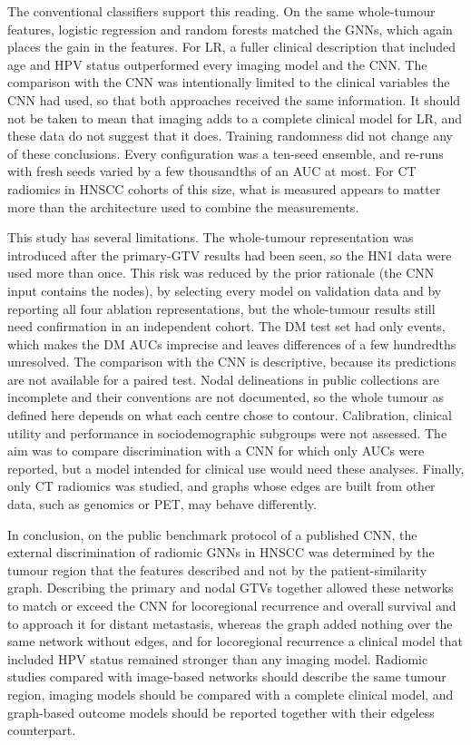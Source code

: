 \documentclass[pdflatex,iicol,sn-nature]{sn-jnl}
\begin{document}
The conventional classifiers support this reading. On the same whole-tumour features, logistic regression and random forests matched the GNNs, which again places the gain in the features. For LR, a fuller clinical description that included age and HPV status outperformed every imaging model and the CNN. The comparison with the CNN was intentionally limited to the clinical variables the CNN had used, so that both approaches received the same information. It should not be taken to mean that imaging adds to a complete clinical model for LR, and these data do not suggest that it does. Training randomness did not change any of these conclusions. Every configuration was a ten-seed ensemble, and re-runs with fresh seeds varied by a few thousandths of an AUC at most. For CT radiomics in HNSCC cohorts of this size, what is measured appears to matter more than the architecture used to combine the measurements.

This study has several limitations. The whole-tumour representation was introduced after the primary-GTV results had been seen, so the HN1 data were used more than once. This risk was reduced by the prior rationale (the CNN input contains the nodes), by selecting every model on validation data and by reporting all four ablation representations, but the whole-tumour results still need confirmation in an independent cohort. The DM test set had only \eTestDM{} events, which makes the DM AUCs imprecise and leaves differences of a few hundredths unresolved. The comparison with the CNN is descriptive, because its predictions are not available for a paired test. Nodal delineations in public collections are incomplete and their conventions are not documented, so the whole tumour as defined here depends on what each centre chose to contour. Calibration, clinical utility and performance in sociodemographic subgroups were not assessed. The aim was to compare discrimination with a CNN for which only AUCs were reported, but a model intended for clinical use would need these analyses. Finally, only CT radiomics was studied, and graphs whose edges are built from other data, such as genomics or PET, may behave differently.

In conclusion, on the public benchmark protocol of a published CNN, the external discrimination of radiomic GNNs in HNSCC was determined by the tumour region that the features described and not by the patient-similarity graph. Describing the primary and nodal GTVs together allowed these networks to match or exceed the CNN for locoregional recurrence and overall survival and to approach it for distant metastasis, whereas the graph added nothing over the same network without edges, and for locoregional recurrence a clinical model that included HPV status remained stronger than any imaging model. Radiomic studies compared with image-based networks should describe the same tumour region, imaging models should be compared with a complete clinical model, and graph-based outcome models should be reported together with their edgeless counterpart.
\end{document}
